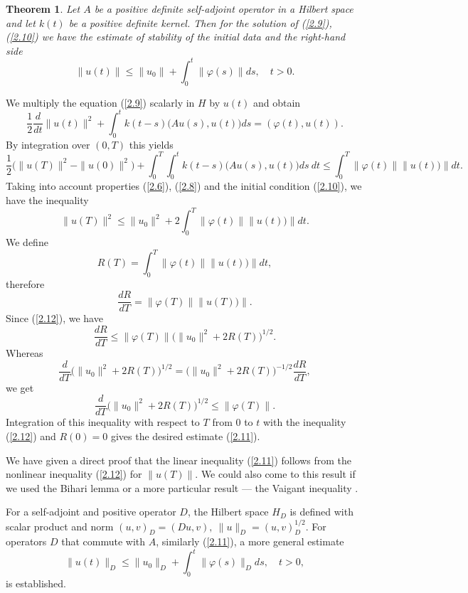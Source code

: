 \documentclass[3p]{elsarticle}
\newtheorem{thm}{Theorem}
\numberwithin{equation}{section}
\begin{document}
\begin{thm}\label{t-1}
Let $A$  be a positive definite self-adjoint operator in a Hilbert space and let $k(t)$ be a positive definite kernel. 
Then for the solution of (\ref{2.9}), (\ref{2.10}) we have the estimate of stability of the initial data and the right-hand side
\begin{equation}\label{2.11}
 \|u(t)\| \leq \|u_0\| + \int_{0}^{t} \|\varphi(s)\| d s,
 \quad t > 0 . 
\end{equation} 
\end{thm}

\begin{pf}
We multiply the equation (\ref{2.9}) scalarly in $H$ by $u(t)$ and obtain
\[
 \frac{1}{2} \frac{d}{d t} \|u(t)\|^2 + \int_{0}^{t} k(t-s)  \big(A u(s), u(t) \big) d s = (\varphi (t), u(t)) .
\] 
By integration over $(0, T)$ this yields 
\[
 \frac{1}{2} \big(\|u(T)\|^2 - \|u(0)\|^2 \big) +  \int_{0}^{T} \int_{0}^{t} k(t-s)  \big(A u(s), u(t) \big) d s \ d t 
 \leq  \int_{0}^{T}  \|\varphi (t)\| \|u(t))\| d t.
\]  
Taking into account properties (\ref{2.6}), (\ref{2.8}) and the initial condition (\ref{2.10}), we have the inequality
\begin{equation}\label{2.12}
 \|u(T)\|^2 \leq \|u_0\|^2 + 2 \int_{0}^{T}  \|\varphi (t)\| \|u(t))\| d t.
\end{equation} 
We define
\[
 R(T) = \int_{0}^{T}  \|\varphi (t)\| \|u(t))\| d t ,
\] 
therefore
\[
 \frac{d R}{d T} = \|\varphi (T)\| \|u(T))\| .
\] 
Since (\ref{2.12}), we have
\[
 \frac{d R}{d T} \leq \|\varphi (T)\| \big(\|u_0\|^2 + 2 R(T)\big)^{1/2} .
\]
Whereas
\[
 \frac{d }{d T} \big(\|u_0\|^2 + 2 R(T)\big)^{1/2} =
 \big(\|u_0\|^2 + 2 R(T)\big)^{-1/2} \frac{d R}{d T} ,
\] 
we get
\[
 \frac{d }{d T} \big(\|u_0\|^2 + 2 R(T)\big)^{1/2} \leq \|\varphi (T)\| . 
\] 
Integration of this inequality with respect to $T$ from $0$ to $t$ with the inequality (\ref{2.12}) and $R(0) = 0$ gives the desired estimate (\ref{2.11}).
\end{pf}

\begin{rmk}
We have given a direct proof that the linear inequality (\ref{2.11}) follows from the nonlinear inequality (\ref{2.12}) for $\|u(T)\|$.
We could also come to this result if we used the Bihari lemma \cite{bihari1956generalization,beckenbach2012inequalities}
or a more particular result --- the Vaigant inequality \cite{kaliev2006boundary,qin2017analytic}. 
\end{rmk}

\begin{rmk}
For a self-adjoint and positive operator $D$, the Hilbert space $H_D$ is defined
with scalar product and norm $(u, v)_D = (D u, v), \ \| u \|_D = (u, v)_D ^ {1/2} $.
For operators $D$ that commute with $A$, similarly (\ref{2.11}), a more general estimate 
\begin{equation}\label{2.13}
 \|u(t)\|_D \leq \|u_0\|_D + \int_{0}^{t} \|\varphi(s)\|_D d s,
 \quad t > 0 , 
\end{equation} 
is established.
\end{rmk}
\end{document}
